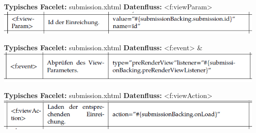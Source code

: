 \documentclass{beamer}
\begin{document}
    \begin{frame}{\textbf{Typisches Facelet:} submission.xhtml}
        \textbf{Datenfluss:} <f:viewParam>
        \newline\newline
        \centering
        \includegraphics[height=0.1\textheight]{graphics/facelet/fac_viewParam}
    \end{frame}
    \begin{frame}{\textbf{Typisches Facelet:} submission.xhtml}
        \textbf{Datenfluss:} <f:event>
        \newline\newline
        \centering
\&       \includegraphics[height=0.1\textheight]{graphics/facelet/fac_event}
    \end{frame}
    \begin{frame}{\textbf{Typisches Facelet:} submission.xhtml}
        \textbf{Datenfluss:} <f:viewAction>
        \newline\newline
        \centering
        \includegraphics[height=0.1\textheight]{graphics/facelet/fac_onLoad}
    \end{frame}
\end{document}
